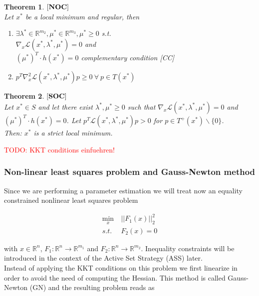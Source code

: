 \documentclass{scrartcl}[12pt, halfparskip]
\newtheorem{Theorem}{Theorem}
\newcommand{\todo}[1]{\textcolor{red}{TODO: #1}}
\begin{document}
\begin{Theorem}
	$[\text{\textbf{NOC}}]$ \\
	Let $x^*$ be a local minimum and regular, then
	\begin{enumerate}
		\item $\exists \lambda^* \in \mathbb{R}^{m_2}, \mu^* \in \mathbb{R}^{m_3}, \mu^* \ge 0$ s.t. \\
		$\nabla_x \mathcal{L}(x^*, \lambda^*, \mu^*) = 0$ and \\
		$(\mu^*)^T \cdot h(x^*) = 0$ complementary condition [CC]
		\item $p^T \nabla_x^2 \mathcal{L}(x^*, \lambda^*, \mu^*) p \ge 0 \ \forall \ p \in T(x^*)$
	\end{enumerate}
\end{Theorem}


\begin{Theorem}
	$[\text{\textbf{SOC}}]$ \\
	Let $x^* \in S$ and let there exist $\lambda^*, \mu^* \ge 0$ such that $\nabla_x \mathcal{L}(x^*, \lambda^*, \mu^*) = 0$ and \\ $(\mu^*)^T \cdot h(x^*) = 0$. 
	Let $p^T \mathcal{L}(x^*, \lambda^*, \mu^*) p > 0$ for $p \in T^+(x^*) \backslash \{0\}$. \\
	Then: $x^*$ is a strict local minimum.
\end{Theorem}

\todo{KKT conditions einfuehren!} \\

\subsubsection{Non-linear least squares problem and Gauss-Newton method}
Since we are performing a parameter estimation we will treat now an equality constrained nonlinear least squares problem

\begin{align}
	\min_x \ & || F_1(x) ||_2^2 \\
	s.t. \ & F_2(x) = 0 \nonumber
\end{align}

with $x \in \mathbb{R}^n$, $F_1: \mathbb{R}^n \rightarrow \mathbb{R}^{m_1}$ and $F_2: \mathbb{R}^n \rightarrow \mathbb{R}^{m_2}$. Inequality constraints will be introduced in the context of the Active Set Strategy (ASS) later. \\
Instead of applying the KKT conditions on this problem we first linearize in order to avoid the need of computing the Hessian. This method is called Gauss-Newton (GN) and the resulting problem reads as
\end{document}
